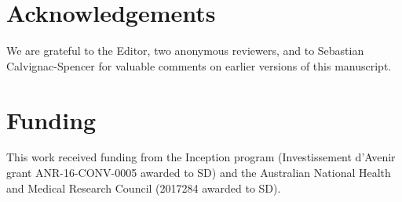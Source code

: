 \documentclass[11pt]{article}
\begin{document}
\section{Acknowledgements}
We are grateful to the Editor, two anonymous reviewers, and to Sebastian Calvignac-Spencer for valuable comments on earlier versions of this manuscript.

\section{Funding}
This work received funding from the Inception program (Investissement d’Avenir grant ANR-16-CONV-0005 awarded to SD) and the Australian National Health and Medical Research Council (2017284 awarded to SD).


%

\end{document}
